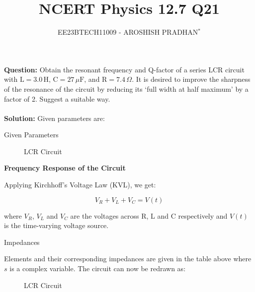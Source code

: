 \documentclass[journal,12pt,twocolumn]{IEEEtran}
\theoremstyle{remark}
\begin{document}

\vspace{3cm}

\title{NCERT Physics 12.7 Q21}
\author{EE23BTECH11009 - AROSHISH PRADHAN$^{*}$%
}
\maketitle
\newpage
\bigskip
\textbf{Question:} 
Obtain the resonant frequency and Q-factor of a series LCR circuit
with $\text{L} = 3.0\, \text{H}$, $\text{C} = 27\, \mu\text{F}$, and $\text{R} = 7.4\, \Omega$. It is desired to improve the
sharpness of the resonance of the circuit by reducing its `full width at half maximum' by a factor of 2. Suggest a suitable way.\\
\\
\textbf{Solution: }
Given parameters are:

\begin{table}[h]
    \centering
    \resizebox{6 cm}{!}{
    }
    \vspace{6 pt}
    \caption{Given Parameters}
    \label{tab:my_label}
\end{table}

\begin{figure}[h]
 \centering
    
    \caption{LCR Circuit}
    \label{fig:enter-label}
\end{figure}

\textbf{Frequency Response of the Circuit}

Applying Kirchhoff's Voltage Law (KVL), we get:

\begin{equation}
V_R + V_L + V_C = V(t) \label{eq:KVL}
\end{equation}

where $V_R$, $V_L$ and $V_C$ are the voltages across R, L and C respectively and $V(t)$ is the time-varying voltage source.

\begin{table}[h]
    \centering
    \resizebox{6 cm}{!}{
    
    }
    \vspace{6 pt}
    \caption{Impedances}
    \label{tab:my_label} 
\end{table}

Elements and their corresponding impedances are given in the table above where $s$ is a complex variable. The circuit can now be redrawn as:

\begin{figure}[h]
 \centering
    
    \caption{LCR Circuit}
    \label{fig:2}
\end{figure}
\end{document}
